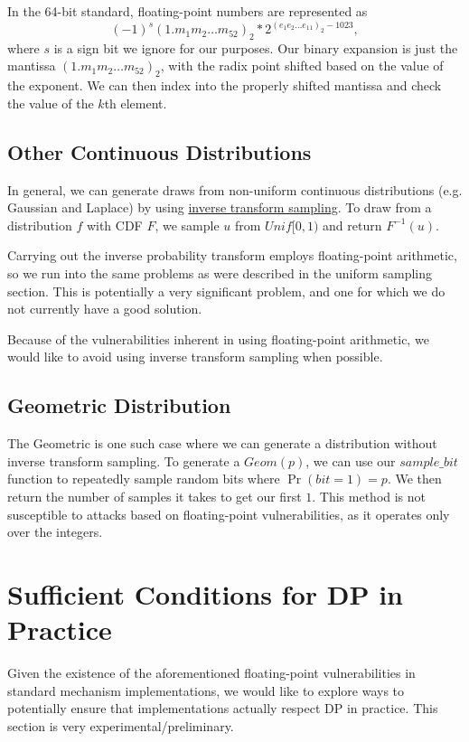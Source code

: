 \documentclass[11pt]{scrartcl} %
\begin{document}
In the 64-bit standard, floating-point numbers are represented as
\[ (-1)^s(1.m_1m_2 \hdots m_{52})_2 * 2^{(e_{1}e_2 \hdots e_{11})_2 - 1023}, \]
where $s$ is a sign bit we ignore for our purposes.
Our binary expansion is just the mantissa $(1.m_1m_2 \hdots m_{52})_2$, with
the radix point shifted based on the value of the exponent.
We can then index into the properly shifted mantissa and check the value of the $k$th element.

\subsection{Other Continuous Distributions}
In general, we can generate draws from non-uniform continuous distributions (e.g. Gaussian and Laplace)
by using \href{https://en.wikipedia.org/wiki/Inverse_transform_sampling}{inverse transform sampling}.
To draw from a distribution $f$ with CDF $F$,
we sample $u$ from $Unif[0,1)$ and return $F^{-1}(u)$. \newline

\begin{tcolorbox}[colback = {green}, title = {Known Privacy Issues}, colbacktitle = black]
	Carrying out the inverse probability transform employs floating-point arithmetic,
	so we run into the same problems as were described in the uniform sampling section.
	This is potentially a very significant problem, and one for which we do not
	currently have a good solution.
\end{tcolorbox}
Because of the vulnerabilities inherent in using floating-point arithmetic, we would
like to avoid using inverse transform sampling when possible.

\subsection{Geometric Distribution}
The Geometric is one such case where we can generate a distribution without inverse transform sampling.
To generate a $Geom(p)$, we can use our $sample\_bit$ function to
repeatedly sample random bits where $\Pr(bit = 1) = p$. We then return the number of samples
it takes to get our first $1$. This method is not susceptible to attacks based on floating-point vulnerabilities,
as it operates only over the integers. \newline

\section{Sufficient Conditions for DP in Practice}
Given the existence of the aforementioned floating-point vulnerabilities in standard mechanism implementations,
we would like to explore ways to potentially ensure that implementations actually respect DP in practice.
This section is very experimental/preliminary.
\end{document}
